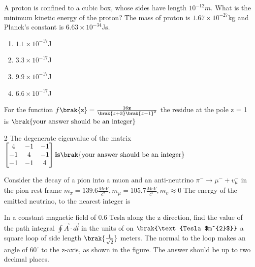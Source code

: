 \iffalse
\chapter{2013}
\author{AI24BTECH11032}
\section{ph}
\fi
\item A proton is confined to a cubic box, whose sides have length $10^{-12}m$. What is the minimum kinetic energy of the proton? The mass of proton is $1.67\times10^{-27}$kg and Planck's constant is
$6.63\times10^{-34}$Js.
\begin{multicols}{4}
    \begin{enumerate}
        \item $1.1\times10^{-17}$J
        \item $3.3\times10^{-17}$J
        \item $9.9\times10^{-17}$J
        \item $6.6\times10^{-17}$J
    \end{enumerate}
\end{multicols}
\bigskip
\item For the function $f\brak{\text{z}}=\frac{16\textbf{z}}{\brak{z+3}\brak{z-1}^{2}}$ the residue at the pole z = 1 is $\brak{\text{your answer should be an integer}}$
\bigskip
\item 2 The degenerate eigenvalue of the matrix\\ $\begin{bmatrix}
4 & -1 & -1 \\
-1 & 4 & -1 \\
-1 & -1 & 4 \\
\end{bmatrix}  \textbf{is} \brak{\text{your answer should be an integer}}$
\bigskip
\item Consider the decay of a pion into a muon and an anti-neutrino $\pi^{-}\to\mu^{-}+v_{\mu}^{-}$ in the pion rest frame $m_{\pi}=139.6\frac{MeV}{c^{2}},m_{\mu}=105.7\frac{MeV}{c^{2}},m_{v}\approx 0$ The energy  of the emitted neutrino, to the nearest integer is
\bigskip
\item In a constant magnetic field of 0.6 Tesla along the z direction, find the value of the path integral $\oint\overrightarrow{A}\cdot\overrightarrow{dl}$ in the units of on $\brak{\text{Tesla $m^{2}$}}$ a square loop of side length $\brak{\frac{1}{\sqrt{2}}}$ meters. The normal to the loop makes an angle of $60^\circ$ to the z-axis, as shown in the figure. The answer should be up to two decimal places.
